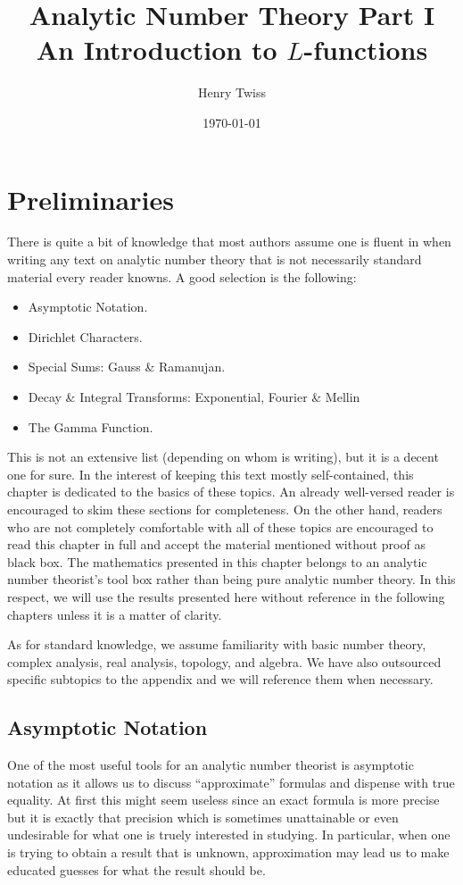 \documentclass[12pt]{book}
\title{Analytic Number Theory Part I \\ \large{An Introduction to $L$-functions}}
\author{Henry Twiss}
\date{\today}
\theoremstyle{definition}\newframedtheorem{method}{Method}
\newcommand{\<}{\langle}
\renewcommand{\>}{\rangle}
\begin{document}
\maketitle
\thispagestyle{fancy}

\newpage

\tableofcontents

\newpage

\chapter{Preliminaries}
  There is quite a bit of knowledge that most authors assume one is fluent in when writing any text on analytic number theory that is not necessarily standard material every reader knowns. A good selection is the following:
  \begin{itemize}
    \item Asymptotic Notation.
    \item Dirichlet Characters.
    \item Special Sums: Gauss \& Ramanujan.
    \item Decay \& Integral Transforms: Exponential, Fourier \& Mellin
    \item The Gamma Function.
  \end{itemize}
  This is not an extensive list (depending on whom is writing), but it is a decent one for sure. In the interest of keeping this text mostly self-contained, this chapter is dedicated to the basics of these topics. An already well-versed reader is encouraged to skim these sections for completeness. On the other hand, readers who are not completely comfortable with all of these topics are encouraged to read this chapter in full and accept the material mentioned without proof as black box. The mathematics presented in this chapter belongs to an analytic number theorist's tool box rather than being pure analytic number theory. In this respect, we will use the results presented here without reference in the following chapters unless it is a matter of clarity.

  As for standard knowledge, we assume familiarity with basic number theory, complex analysis, real analysis, topology, and algebra. We have also outsourced specific subtopics to the appendix and we will reference them when necessary.
  \section{Asymptotic Notation}
    One of the most useful tools for an analytic number theorist is asymptotic notation as it allows us to discuss ``approximate'' formulas and dispense with true equality. At first this might seem useless since an exact formula is more precise but it is exactly that precision which is sometimes unattainable or even undesirable for what one is truely interested in studying. In particular, when one is trying to obtain a result that is unknown, approximation may lead us to make educated guesses for what the result should be.
\end{document}
